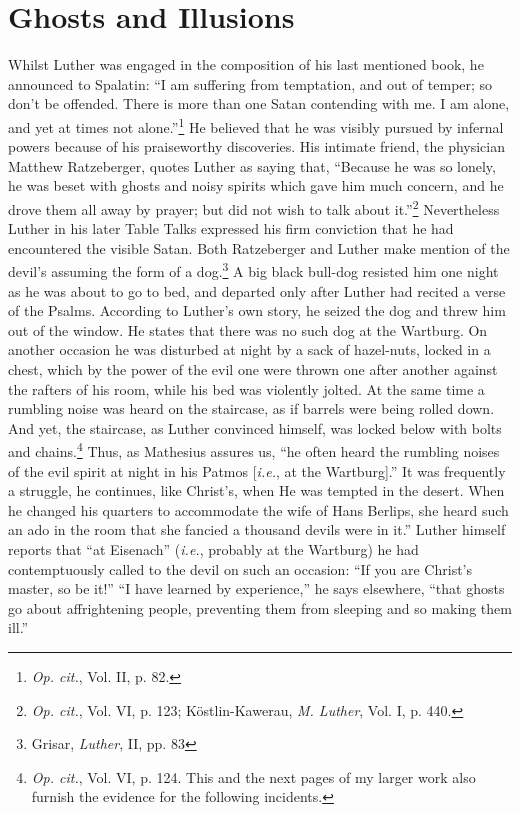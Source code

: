 \section{Ghosts and Illusions}

Whilst Luther was engaged in the composition of his last mentioned book,
he announced to Spalatin: “I am suffering from
temptation, and out of temper; so don’t be offended. There is more
than one Satan contending with me. I am alone, and yet at times not
alone.”\footnote{\textit{Op. cit.}, Vol. II, p. 82.}
He believed that he was visibly pursued by infernal powers
because of his praiseworthy discoveries. His intimate friend, the
physician Matthew Ratzeberger, quotes Luther as saying that, “Because he
was so lonely, he was beset with ghosts and noisy spirits
which gave him much concern, and he drove them all away by prayer;
but did not wish to talk about it.”\footnote{\textit{Op. cit.}, Vol. VI, p. 123; Köstlin-Kawerau, \textit{M. Luther}, Vol. I, p. 440.}
Nevertheless Luther in his later Table Talks expressed his firm
conviction that he had encountered the visible Satan. Both Ratzeberger
and Luther make mention of the devil’s assuming the form of
a dog.\footnote{Grisar, \textit{Luther}, II, pp. 83}
A big black bull-dog resisted him one night as he was about
to go to bed, and departed only after Luther had recited a verse of
the Psalms. According to Luther’s own story, he seized the dog
and threw him out of the window. He states that there was no such
dog at the Wartburg. On another occasion he was disturbed at night
by a sack of hazel-nuts, locked in a chest, which by the power of the
evil one were thrown one after another against the rafters of his room,
while his bed was violently jolted. At the same time a rumbling noise
was heard on the staircase, as if barrels were being rolled down. And
yet, the staircase, as Luther convinced himself, was locked below with
bolts and chains.\footnote
{\textit{Op. cit.}, Vol. VI, p. 124. This and the next pages of my larger work also furnish the
evidence for the following incidents.}
Thus, as Mathesius assures us, ``he often heard the
rumbling noises of the evil spirit at night in his Patmos [\textit{i.e.}, at the
Wartburg].'' It was frequently a struggle, he continues, like Christ’s,
when He was tempted in the desert. When he changed his quarters to
accommodate the wife of Hans Berlips, she heard such an ado in the
room that she fancied a thousand devils were in it.” Luther himself
reports that “at Eisenach” (\textit{i.e.}, probably at the Wartburg) he had
contemptuously called to the devil on such an occasion: “If you are
Christ’s master, so be it!” “I have learned by experience,” he says
elsewhere, “that ghosts go about affrightening people, preventing
them from sleeping and so making them ill.”

